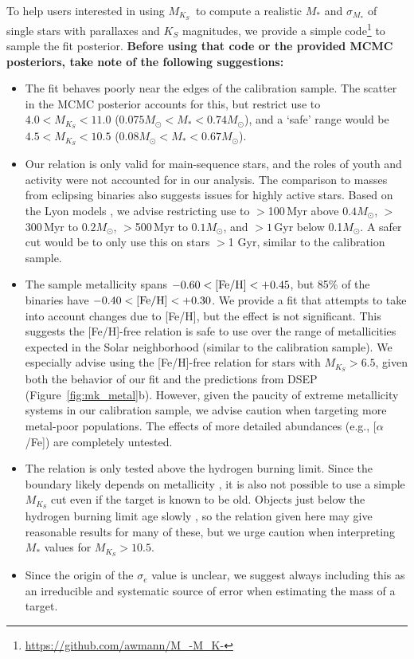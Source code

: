 \documentclass[twocolumn]{aastex62}
\newcommand{\mks}{$M_{K_S}$}
\begin{document}
To help users interested in using \mks\ to compute a realistic $M_*$ and $\sigma_{M_*}$ of single stars with parallaxes and $K_S$ magnitudes, we provide a simple code\footnote{\href{https://github.com/awmann/M_-M_K-}{https://github.com/awmann/M\_-M\_K-}} to sample the fit posterior. {\bf Before using that code or the provided MCMC posteriors, take note of the following suggestions:}
\begin{itemize}
\item The fit behaves poorly near the edges of the calibration sample. The scatter in the MCMC posterior accounts for this, but restrict use to $4.0<M_{K_S}<11.0$ ($0.075M_\odot<M_*<0.74M_\odot$), and a `safe' range would be $4.5<M_{K_S}<10.5$ ($0.08M_\odot<M_*<0.67M_\odot$). 

\item Our relation is only valid for main-sequence stars, and the roles of youth and activity were not accounted for in our analysis. The comparison to masses from eclipsing binaries also suggests issues for highly active stars. Based on the Lyon models \citep{BHAC15}, we advise restricting use to $>$100\,Myr above $0.4M_\odot$, $>$300\,Myr to $0.2M_\odot$, $>$500\,Myr to $0.1M_\odot$, and $>1$\,Gyr below 0.1$M_\odot$. A safer cut would be to only use this on stars $>$1 Gyr, similar to the calibration sample.

\item The sample metallicity spans $-0.60<\rm{[Fe/H]}<+0.45$, but 85\% of the binaries have $-0.40<\rm{[Fe/H]}<+0.30$. We provide a fit that attempts to take into account changes due to [Fe/H], but the effect is not significant. This suggests the [Fe/H]-free relation is safe to use over the range of metallicities expected in the Solar neighborhood (similar to the calibration sample). We especially advise using the [Fe/H]-free relation for stars with \mks$>6.5$, given both the behavior of our fit and the predictions from DSEP (Figure~\ref{fig:mk_metal}b). However, given the paucity of extreme metallicity systems in our calibration sample, we advise caution when targeting more metal-poor populations. The effects of more detailed abundances (e.g., [$\alpha$/Fe]) are completely untested.

\item The relation is only tested above the hydrogen burning limit. Since the boundary likely depends on metallicity \citep{2001RvMP...73..719B}, it is also not possible to use a simple $M_{K_S}$ cut even if the target is known to be old. Objects just below the hydrogen burning limit age slowly \citep{BHAC15}, so the relation given here may give reasonable results for many of these, but we urge caution when interpreting $M_*$ values for $M_{K_S}>10.5$. 

\item Since the origin of the $\sigma_e$ value is unclear, we suggest always including this as an irreducible and systematic source of error when estimating the mass of a target. 

\end{itemize}
\end{document}
